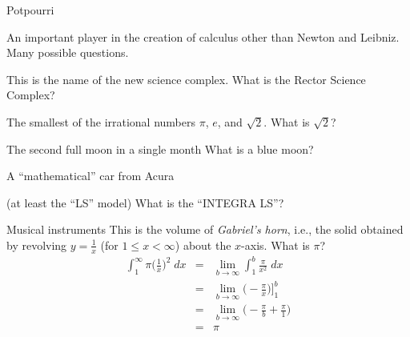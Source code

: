 \documentclass{article}
\begin{document}
\begin{category}{Potpourri}

  \begin{clue}
    An important player in the creation of calculus other than Newton and Leibniz.
  \response
    Many possible questions.
  \end{clue}

  \begin{clue}
    This is the name of the new science complex.
  \response
    What is the Rector Science Complex?
  \end{clue}

  \begin{clue}
    The smallest of the irrational numbers $\pi$, $e$, and $\sqrt{2}$.
  \response
    What is $\sqrt{2}$?
  \end{clue}

  \begin{clue}
    The second full moon in a single month
  \response
    What is a blue moon?
  \end{clue}

  \begin{clue}
    A ``mathematical'' car from Acura

    (at least the ``LS'' model)
  \response
    What is the ``INTEGRA LS''?
  \end{clue}

\end{category}

\begin{final}{Musical instruments}
  This is the volume of \emph{Gabriel's horn}, i.e., the solid obtained by
  revolving $\displaystyle y=\frac{1}{x}$ (for $1\le x<\infty$) about the
  $x$-axis.
\response
  What is $\pi$?
\solution
  \[
  \begin{array}{rcl}
  {\displaystyle \int_{1}^{\infty}\pi\Big(\frac{1}{x}\Big)^{2}\; dx} & = & {\displaystyle \lim_{b\to \infty} \int_{1}^{b}\frac{\pi}{x^{2}}\; dx} \\
  & = & {\displaystyle \lim_{b\to \infty}\Big(-\frac{\pi}{x}\Big)\Big]_{1}^{b}}\\
  & = & {\displaystyle \lim_{b\to \infty}\Big(-\frac{\pi}{b}+\frac{\pi}{1}\Big)}\\
  & = & \pi
  \end{array}
  \]
\end{final}
\end{document}
